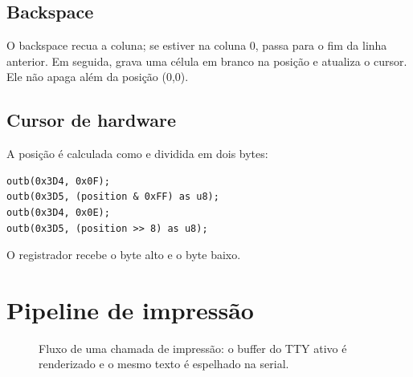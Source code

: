 \subsection{Backspace}

O backspace recua a coluna; se estiver na coluna 0, passa para o fim da linha
anterior. Em seguida, grava uma c\'elula em branco na posi\c{c}\~ao e atualiza
o cursor. Ele n\~ao apaga al\'em da posi\c{c}\~ao (0,0).

\subsection{Cursor de hardware}

A posi\c{c}\~ao \'e calculada como  e dividida em dois
bytes:

\begin{lstlisting}[caption={Atualiza\c{c}\~ao do cursor via CRTC.},label={lst:cursor}]
outb(0x3D4, 0x0F);
outb(0x3D5, (position & 0xFF) as u8);
outb(0x3D4, 0x0E);
outb(0x3D5, (position >> 8) as u8);
\end{lstlisting}

O registrador  recebe o byte alto e  o byte baixo.

\section{Pipeline de impress\~ao}

\begin{figure}[H]
\centering
{}
\caption{Fluxo de uma chamada de impress\~ao: o buffer do TTY ativo \'e
renderizado e o mesmo texto \'e espelhado na serial.}
\label{fig:printpipeline}
\end{figure}

